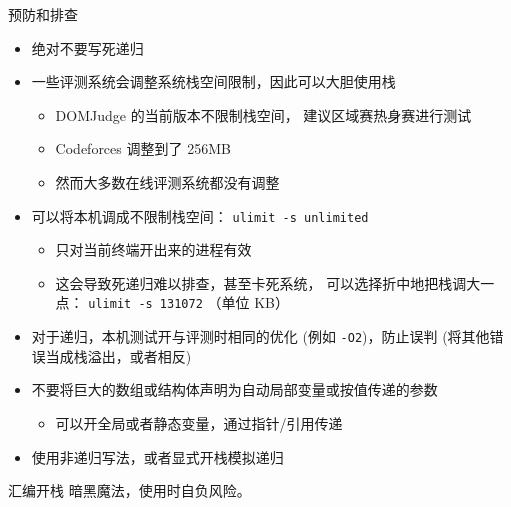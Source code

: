 \documentclass[10pt,mathserif]{beamer}
\begin{document}
\begin{frame}{预防和排查}
	\begin{itemize}
		\item 绝对不要写死递归
		\item 一些评测系统会调整系统栈空间限制，因此可以大胆使用栈
			\begin{itemize}
				\item DOMJudge 的当前版本不限制栈空间，
					建议区域赛热身赛进行测试
				\item Codeforces 调整到了 256MB
				\item 然而大多数在线评测系统都没有调整
			\end{itemize}
		\item 可以将本机调成不限制栈空间：
			\lstinline|ulimit -s unlimited|
			\begin{itemize}
				\item 只对当前终端开出来的进程有效
				\item 这会导致死递归难以排查，甚至卡死系统，
					可以选择折中地把栈调大一点：
					\lstinline|ulimit -s 131072| （单位 KB）
			\end{itemize}
		\item 对于递归，本机测试开与评测时相同的优化
			(例如 \lstinline|-O2|)，防止误判
			(将其他错误当成栈溢出，或者相反)
		\item 不要将巨大的数组或结构体声明为自动局部变量或按值传递的参数
			\begin{itemize}
				\item 可以开全局或者静态变量，通过指针/引用传递
			\end{itemize}
		\item 使用非递归写法，或者显式开栈模拟递归
	\end{itemize}
\end{frame}

\begin{frame}{汇编开栈}
	暗黑魔法，使用时自负风险。
	
\end{frame}

{\xdbg%
\begin{frame}
\end{frame}}
\end{document}
